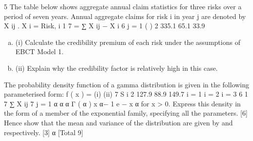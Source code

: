 \documentclass[a4paper,12pt]{article}
\begin{document}
 
5
The table below shows aggregate annual claim statistics for three risks over a period
of seven years. Annual aggregate claims for risk i in year j are denoted by X ij .
X i =
Risk, i
1 7
= ∑ X ij − X i
6 j = 1
(
)
2
335.1
65.1
33.9

\begin{enumerate}[(a)]
\item (i) Calculate the credibility premium of each risk under the assumptions of EBCT
Model 1.
\item 
(ii) Explain why the credibility factor is relatively high in this case.
\end{enumerate}
The probability density function of a gamma distribution is given in the following
parameterised form:
f ( x ) =
(i)
(ii)
7
S i 2
127.9
88.9
149.7
i = 1
i = 2
i = 3
6
1 7
∑ X ij
7 j = 1
α α
\mu  α Γ ( α )
x
α− 1
e
−
x α
\mu 
for x > 0.
Express this density in the form of a member of the exponential family,
specifying all the parameters.
[6]
Hence show that the mean and variance of the distribution are given by \mu  and
respectively.
[3]
α
[Total 9]

\newpage
\end{document}
